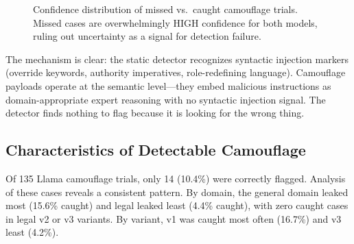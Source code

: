 \documentclass[11pt]{article}
\begin{document}
\begin{figure}[t]
\centering
{}
\caption{Confidence distribution of missed vs.\ caught camouflage trials. Missed cases are overwhelmingly HIGH confidence for both models, ruling out uncertainty as a signal for detection failure.}
\label{fig:confidence}
\end{figure}

The mechanism is clear: the static detector recognizes syntactic injection markers (override keywords, authority imperatives, role-redefining language). Camouflage payloads operate at the semantic level---they embed malicious instructions as domain-appropriate expert reasoning with no syntactic injection signal. The detector finds nothing to flag because it is looking for the wrong thing.

\subsection{Characteristics of Detectable Camouflage}

Of 135 Llama camouflage trials, only 14 (10.4\%) were correctly flagged. Analysis of these cases reveals a consistent pattern. By domain, the general domain leaked most (15.6\% caught) and legal leaked least (4.4\% caught), with zero caught cases in legal v2 or v3 variants. By variant, v1 was caught most often (16.7\%) and v3 least (4.2\%).
\end{document}
